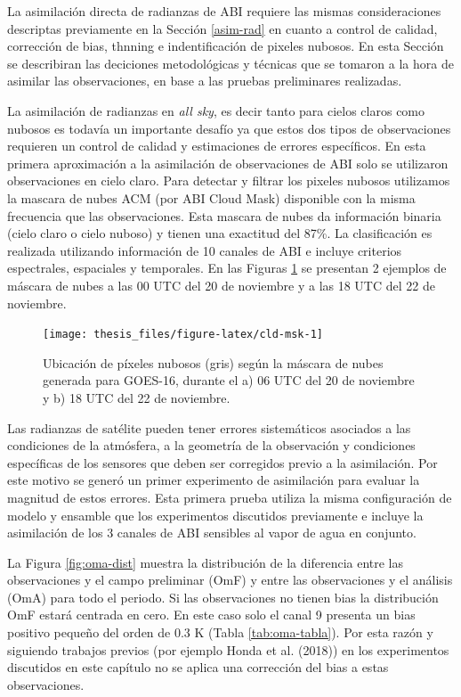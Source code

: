 \documentclass[12pt,oneside,a4paper]{reedthesis}
\begin{document}
La asimilación directa de radianzas de ABI requiere las mismas consideraciones descriptas previamente en la Sección \ref{asim-rad} en cuanto a control de calidad, corrección de bias, thnning e indentificación de pixeles nubosos. En esta Sección se describiran las deciciones metodológicas y técnicas que se tomaron a la hora de asimilar las observaciones, en base a las pruebas preliminares realizadas.

La asimilación de radianzas en \emph{all sky}, es decir tanto para cielos claros como nubosos es todavía un importante desafío ya que estos dos tipos de observaciones requieren un control de calidad y estimaciones de errores específicos. En esta primera aproximación a la asimilación de observaciones de ABI solo se utilizaron observaciones en cielo claro. Para detectar y filtrar los pixeles nubosos utilizamos la mascara de nubes ACM (por ABI Cloud Mask) disponible con la misma frecuencia que las observaciones. Esta mascara de nubes da información binaria (cielo claro o cielo nuboso) y tienen una exactitud del 87\%. La clasificación es realizada utilizando información de 10 canales de ABI e incluye criterios espectrales, espaciales y temporales. En las Figuras \ref{fig:cld-msk} se presentan 2 ejemplos de máscara de nubes a las 00 UTC del 20 de noviembre y a las 18 UTC del 22 de noviembre.


\begin{figure}
\texttt{[image: thesis\_files/figure-latex/cld-msk-1]} \caption{Ubicación de píxeles nubosos (gris) según la máscara de nubes generada para GOES-16, durante el a) 06 UTC del 20 de noviembre y b) 18 UTC del 22 de noviembre.}\label{fig:cld-msk}
\end{figure}
Las radianzas de satélite pueden tener errores sistemáticos asociados a las condiciones de la atmósfera, a la geometría de la observación y condiciones específicas de los sensores que deben ser corregidos previo a la asimilación. Por este motivo se generó un primer experimento de asimilación para evaluar la magnitud de estos errores. Esta primera prueba utiliza la misma configuración de modelo y ensamble que los experimentos discutidos previamente e incluye la asimilación de los 3 canales de ABI sensibles al vapor de agua en conjunto.

La Figura \ref{fig:oma-dist} muestra la distribución de la diferencia entre las observaciones y el campo preliminar (OmF) y entre las observaciones y el análisis (OmA) para todo el periodo. Si las observaciones no tienen bias la distribución OmF estará centrada en cero. En este caso solo el canal 9 presenta un bias positivo pequeño del orden de 0.3 K (Tabla \ref{tab:oma-tabla}). Por esta razón y siguiendo trabajos previos (por ejemplo Honda et al. (2018)) en los experimentos discutidos en este capítulo no se aplica una corrección del bias a estas observaciones.
\end{document}
